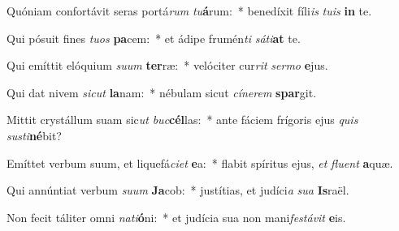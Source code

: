 \item Quóniam confortávit seras portá\textit{rum} \textit{tu}\textbf{á}rum:~* benedíxit fíli\textit{is} \textit{tu}\textit{is} \textbf{in} te.
\item Qui pósuit fines \textit{tu}\textit{os} \textbf{pa}cem:~* et ádipe frumén\textit{ti} \textit{sá}\textit{ti}\textbf{at} te.
\item Qui emíttit elóquium \textit{su}\textit{um} \textbf{ter}ræ:~* velóciter cur\textit{rit} \textit{ser}\textit{mo} \textbf{e}jus.
\item Qui dat nivem \textit{sic}\textit{ut} \textbf{la}nam:~* nébulam sicut \textit{cí}\textit{ne}\textit{rem} \textbf{spar}git.
\item Mittit crystállum suam sic\textit{ut} \textit{buc}\textbf{cél}las:~* ante fáciem frígoris ejus \textit{quis} \textit{sus}\textit{ti}\textbf{né}bit?
\item Emíttet verbum suum, et liquefá\textit{ci}\textit{et} \textbf{e}a:~* flabit spíritus ejus, \textit{et} \textit{flu}\textit{ent} \textbf{a}quæ.
\item Qui annúntiat verbum \textit{su}\textit{um} \textbf{Ja}cob:~* justítias, et judíci\textit{a} \textit{su}\textit{a} \textbf{Is}raël.
\item Non fecit táliter omni \textit{na}\textit{ti}\textbf{ó}ni:~* et judícia sua non mani\textit{fes}\textit{tá}\textit{vit} \textbf{e}is.
